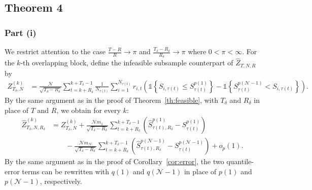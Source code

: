 \subsection{Theorem 4}
\label{Proof of th:subsampling}

\subsubsection{Part (i)}

We restrict attention to the case $\frac{T-R}{R} \rightarrow \pi$ and $\frac{T_\delta-R_\delta}{R_\delta} \rightarrow \pi$ where $0<\pi <\infty$.
For the $k$-th overlapping block, define the infeasible subsample counterpart of
$\widehat{Z}_{T,N,R}$ by
\begin{align*}
Z_{T_\delta,N}^{(k)}
&= \frac{\mathcal{N}}{\sqrt{T_\delta-R_\delta}}
\sum_{t=k+R_\delta}^{k+T_\delta-1}
\frac{1}{N_{\tau(t)}}\sum_{i=1}^{N_{\tau(t)}}r_{i,t}
\left(
\mathds{1}\left\{ S_{i,\tau(t)}\leq S_{\tau(t)}^{p(1)}\right\}
- \mathds{1}\left\{ S_{\tau(t)}^{p(\mathcal{N}-1)}<S_{i,\tau(t)}\right\}
\right).
\end{align*}
By the same argument as in the proof of Theorem~\ref{th:feasible}, with
$T_\delta$ and $R_\delta$ in place of $T$ and $R$, we obtain for every $k$:
\begin{align*}
\widehat{Z}_{T_\delta,N,R_\delta}^{(k)}
&= Z_{T_\delta,N}^{(k)}
+\frac{\mathcal{N}m_{1}}{\sqrt{T_\delta-R_\delta}}
\sum_{t=k+R_\delta}^{k+T_\delta-1}
\left( \widehat{S}_{\tau(t),R_\delta}^{p(1)}-S_{\tau(t)}^{p(1)}\right) \\
&\qquad
-\frac{\mathcal{N}m_{\mathcal{N}}}{\sqrt{T_\delta-R_\delta}}
\sum_{t=k+R_\delta}^{k+T_\delta-1}
\left( \widehat{S}_{\tau(t),R_\delta}^{p(\mathcal{N}-1)}-S_{\tau(t)}^{p(\mathcal{N}-1)}\right)
+ o_p(1).
\end{align*}
By the same argument as in the proof of Corollary~\ref{cor:error}, the two
quantile-error terms can be rewritten with $q(1)$ and $q(\mathcal{N}-1)$ in
place of $p(1)$ and $p(\mathcal{N}-1)$, respectively.

